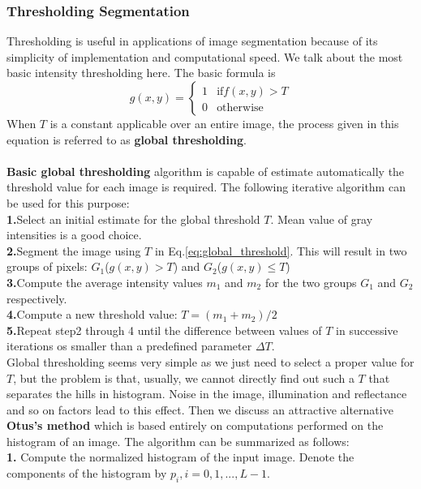 \subsubsection{Thresholding Segmentation}
Thresholding is useful in applications of image segmentation because of its simplicity of implementation and computational speed. We talk about the most basic intensity thresholding here. The basic formula is 
\begin{equation}g(x,y)=\left \{ \begin{array}{rcl}
1 & \text{if}f(x,y)>T \\
0 & \text{otherwise}  \end{array} \right.\label{eq:global_threshold}\end{equation}
When $T$ is a constant applicable over an entire image, the process given in this equation is referred to as \textbf{global thresholding}. \\
\\
\textbf{Basic global thresholding} algorithm is capable of estimate automatically the threshold value for each image is required. The following iterative algorithm can be used for this purpose:\\
\textbf{1.}Select an initial estimate for the global threshold $T$. Mean value of gray intensities is a good choice.\\
\textbf{2.}Segment the image using $T$ in Eq.\ref{eq:global_threshold}. This will result in two groups of pixels: $G_1$($g(x,y)>T$) and $G_2$($g(x,y)\leq T$)\\
\textbf{3.}Compute the average intensity values $m_1$ and $m_2$ for the two groups $G_1$ and $G_2$ respectively.\\
\textbf{4.}Compute a new threshold value: $T=(m_1+m_2)/2$\\
\textbf{5.}Repeat step2 through 4 until the difference between values of $T$ in successive iterations os smaller than a predefined parameter $\Delta T$.\\
Global thresholding seems very simple as we just need to select a proper value for $T$, but the problem is that, usually, we cannot directly find out such a $T$ that separates the hills in histogram. Noise in the image, illumination and reflectance and so on factors lead to this effect.
Then we discuss an attractive alternative \textbf{Otus's method} which is based entirely on computations performed on the histogram of an image. The algorithm can be summarized as follows:\\
\textbf{1.} Compute the normalized histogram of the input image. Denote the components of the histogram by $p_i, i=0,1,...,L-1$.\\
